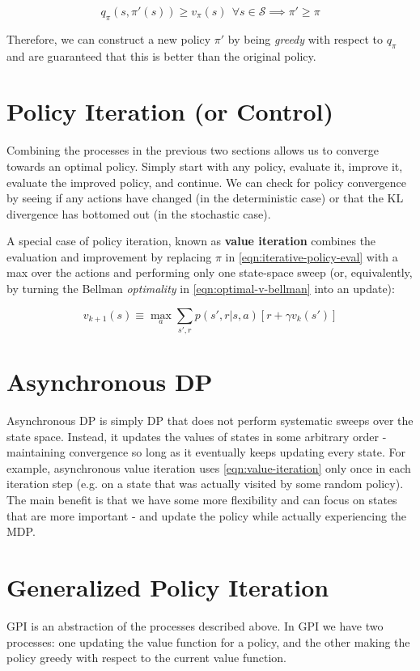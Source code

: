 \documentclass[11pt]{report}
\begin{document}
\begin{equation}
	\label{eqn:policy-improvement-theorem}
	q_\pi(s,\pi'(s)) \geq v_\pi(s) \ \ \forall s \in \mathcal{S} \implies \pi' \geq \pi
\end{equation}

Therefore, we can construct a new policy $\pi'$ by being \textit{greedy} with respect to $q_\pi$ and are guaranteed that this is better than the original policy.


\section{Policy Iteration (or Control)}
Combining the processes in the previous two sections allows us to converge towards an optimal policy. Simply start with any policy, evaluate it, improve it, evaluate the improved policy, and continue. We can check for policy convergence by seeing if any actions have changed (in the deterministic case) or that the KL divergence has bottomed out (in the stochastic case).

A special case of policy iteration, known as \textbf{value iteration} combines the evaluation and improvement by replacing $\pi$ in \autoref{eqn:iterative-policy-eval} with a max over the actions and performing only one state-space sweep (or, equivalently, by turning the Bellman \textit{optimality} in \autoref{eqn:optimal-v-bellman} into an update):

\begin{equation}
	\label{eqn:value-iteration}
	v_{k+1}(s) \equiv \max_{a}\sum_{s',r} p(s',r | s,a)[r+\gamma v_k(s')]
\end{equation}

\section{Asynchronous DP}
Asynchronous DP is simply DP that does not perform systematic sweeps over the state space. Instead, it updates the values of states in some arbitrary order - maintaining convergence so long as it eventually keeps updating every state. For example, asynchronous value iteration uses \autoref{eqn:value-iteration} only once in each iteration step (e.g. on a state that was actually visited by some random policy). The main benefit is that we have some more flexibility and can focus on states that are more important - and update the policy while actually experiencing the MDP.

\section{Generalized Policy Iteration}
GPI is an abstraction of the processes described above. In GPI we have two processes: one updating the value function for a policy, and the other making the policy greedy with respect to the current value function.
\end{document}
